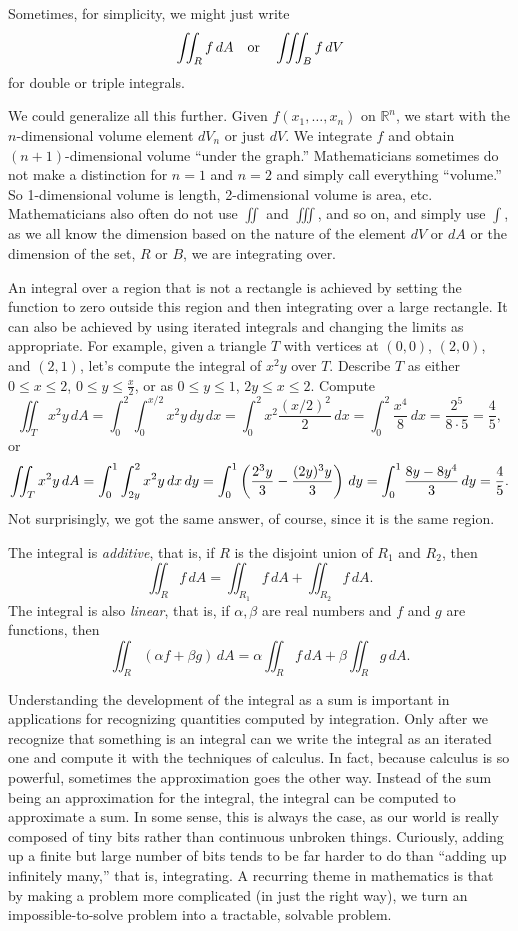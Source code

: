 \documentclass[12pt]{article}
\newcommand{\R}{{\mathbb{R}}}
\newcommand{\avoidbreak}{\postdisplaypenalty=100}
\begin{document}
Sometimes, for simplicity, we might just write
\[
\iint_R f \, dA
\quad \text{or} \quad
\iiint_B f \, dV
\avoidbreak
\]
for double or triple integrals.

We could generalize all this further. Given $f(x_1,\ldots,x_n)$ on $\R^n$, we start with
the $n$-dimensional volume element $dV_n$ or just $dV$.
We integrate $f$ and obtain
$(n+1)$-dimensional volume ``under the graph.''
Mathematicians sometimes do not make a distinction for $n=1$ and $n=2$ and simply call
everything ``volume.''
So 1-dimensional volume is length, 2-dimensional volume is
area, etc.
Mathematicians also often do not use $\iint$ and $\iiint$,
and so on, and simply use $\int$,
as we all know the dimension based on the nature of
the element $dV$ or $dA$ or the dimension of the
set, $R$ or $B$, we are integrating over.

An integral over a region that is not a rectangle
is achieved by setting the function to zero
outside this region and then integrating over
a large rectangle.  It can also be achieved by
using iterated integrals and
changing the limits as appropriate.  For example,
given a triangle $T$ with vertices at $(0,0)$, $(2,0)$,
and $(2,1)$, let's compute the integral of $x^2y$
over $T$.  Describe $T$ as either
$0 \leq x \leq 2$, $0 \leq y \leq \frac{x}{2}$, or as
$0 \leq y \leq 1$, $2y \leq x \leq 2$.  Compute
\[
\iint_T x^2 y \, dA
=
\int_0^2 \int_0^{x/2} x^2y \, dy \, dx
=
\int_0^2 x^2\frac{(x/2)^2}{2}  \, dx
=
\int_0^2 \frac{x^4}{8}  \, dx
=
 \frac{2^5}{8 \cdot 5} = \frac{4}{5} ,
\]
or
\[
\iint_T x^2 y \, dA
=
\int_0^1 \int_{2y}^{2} x^2y \, dx \, dy
=
\int_0^1 \left(\frac{2^3 y}{3} - \frac{(2y)^3y}{3} \right) \, dy
=
\int_0^1 \frac{8y-8y^4}{3} \, dy
=
\frac{4}{5} .
\avoidbreak
\]
Not surprisingly, we got the same answer, of course, since it is the same region.

The integral is \emph{additive}, that is, if $R$ is the disjoint union of $R_1$ and $R_2$,
then
\[
\iint_R f \, dA = 
\iint_{R_1} f \, dA +
\iint_{R_2} f \, dA .
\]
The integral is also \emph{linear}, that is, if $\alpha, \beta$ are real numbers and
$f$ and $g$ are functions, then
\[
\iint_R (\alpha f + \beta g) \, dA = 
\alpha \iint_R f \, dA +
\beta \iint_R g \, dA .
\]

Understanding the development of the integral as a sum is important
in applications for recognizing quantities computed by integration.
Only after we recognize that something is an integral can we write the integral as an iterated
one and compute it with the techniques of calculus.
In fact, because calculus is
so powerful, sometimes the approximation goes the other way.
Instead of the sum being an approximation for the integral, the integral can be
computed to approximate a sum.
In some sense, this is always the case, as our world is
really composed of tiny bits rather than continuous unbroken things.
Curiously, adding up a finite but large number of bits tends to be far harder to do than
``adding up infinitely many,'' that is, integrating.
A recurring theme in mathematics is that by making a problem more complicated
(in just the right way), we turn an impossible-to-solve problem
into a tractable, solvable problem.
\end{document}
